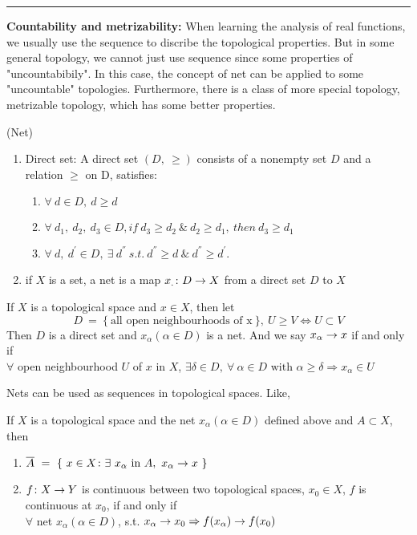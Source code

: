 \documentclass[a4paper,11pt]{report}
\begin{document}
\rule{1mm}{1mm} \textbf{Countability and metrizability:} When learning the analysis of real functions, we usually use the sequence to discribe the topological properties. But in some general topology, we cannot just use sequence since some properties of "uncountabibily". In this case, the concept of net can be applied to some "uncountable" topologies. Furthermore, there is a class of more special topology, metrizable topology, which has some better properties.

\begin{defn}
	(Net)
	\begin{enumerate}[label=\arabic*)]
		\item Direct set: A direct set $(D,~\geqslant)$ consists of a nonempty set $D$ and a relation $\geqslant$ on D, satisfies:
		\begin{enumerate}[label=\roman*)]
			\item $\forall ~ d \in D,~ d \geqslant d$
			\item $\forall ~ d_1,~d_2,~d_3 \in D, if ~ d_3 \geqslant d_2 ~ \& ~ d_2 \geqslant d_1,~ then ~ d_3 \geqslant d_1$
			\item $\forall ~ d,~ d^{'} \in D,~ \exists ~ d^{''}  ~s.t.~ d^{''} \geqslant d ~ \& ~ d^{''} \geqslant d^{'}$.
		\end{enumerate}
		\item if $X$ is a set, a net is a map $x_. \colon D \rightarrow X$ from a direct set $D$ to $X$
	\end{enumerate}
\end{defn}
\begin{exam}
	If $X$ is a topological space and $x \in X$, then let 
	\begin{equation*}
		D ~=~ \{~ \text{all open neighbourhoods of x} ~\},~ U \geqslant V \Leftrightarrow U \subset V
	\end{equation*}
	Then $D$ is a direct set and $x_\alpha(\alpha \in D)$ is a net.
	And we say $ x_\alpha \rightarrow x$ if and only if \\
	$\forall$ open neighbourhood $U$ of $x$ in $X$, $\exists  \delta \in D,~ \forall ~ \alpha \in D \text{ with } \alpha \geqslant \delta \Rightarrow x_\alpha \in U$
\end{exam}
Nets can be used as sequences in topological spaces. Like, 
\begin{prop}
	If $X$ is a topological space and the net $x_\alpha(\alpha \in D)$ defined above and $A \subset X$, then
	\begin{enumerate}[label=\arabic*)]
		\item $\overline{A} ~=~ \{~ x \in X \colon \exists ~ x_\alpha \text{ in } A,~ x_\alpha \rightarrow x ~\}$
		\item $f \colon X \rightarrow Y$ is continuous between two topological spaces, $x_0 \in X$, $f$ is continuous at $x_0$, if and only if\\
		$\forall$ net $x_\alpha(\alpha \in D)$, s.t. $x_\alpha \rightarrow x_0 \Rightarrow f(x_\alpha) \rightarrow f(x_0)$
	\end{enumerate}
\end{prop}
\end{document}

